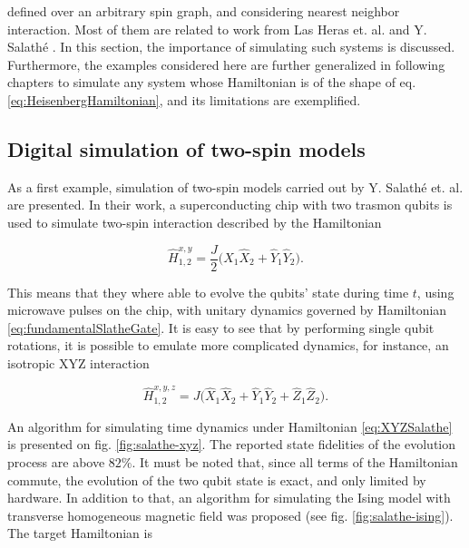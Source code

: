   \noindent defined over an arbitrary spin graph, and considering nearest neighbor interaction. Most of them are related to work from Las Heras et. al. \cite{HubbardSimul,HubbardSimulLasHeras} and Y. Salathé \cite{HeisenbergSimulLasHeras}. In this section, the importance of simulating such systems is discussed. Furthermore, the examples considered here are further generalized in following chapters to simulate any system whose Hamiltonian is of the shape of eq. \ref{eq:HeisenbergHamiltonian}, and its limitations are exemplified.

  \subsection{Digital simulation of two-spin models}
  \label{subsec:SalatheEtAl}

    As a first example, simulation of two-spin models carried out by Y. Salathé et. al. \cite{HeisenbergSimulLasHeras} are presented. In their work, a superconducting chip with two trasmon qubits is used to simulate two-spin interaction described by the Hamiltonian

    \begin{equation}
      \hat{H}_{1,2}^{x,y} = \frac{J}{2} \bigg( \hat{X}_1 \hat{X}_2 + \hat{Y}_1 \hat{Y}_2 \bigg).
      \label{eq:fundamentalSlatheGate}
    \end{equation}

    This means that they where able to evolve the qubits' state during time $t$, using microwave pulses on the chip, with unitary dynamics governed by Hamiltonian \ref{eq:fundamentalSlatheGate}. It is easy to see that by performing single qubit rotations, it is possible to emulate more complicated dynamics, for instance, an isotropic XYZ interaction

    \begin{equation}
      \hat{H}_{1,2}^{x,y,z} = J \bigg( \hat{X}_1 \hat{X}_2 + \hat{Y}_1 \hat{Y}_2 + \hat{Z}_1 \hat{Z}_2 \bigg).
      \label{eq:XYZSalathe}
    \end{equation}

    An algorithm for simulating time dynamics under Hamiltonian \ref{eq:XYZSalathe} is presented on fig. \ref{fig:salathe-xyz}. The reported state fidelities of the evolution process are above $82\%$. It must be noted that, since all terms of the Hamiltonian commute, the evolution of the two qubit state is exact, and only limited by hardware. In addition to that, an algorithm for simulating the Ising model with transverse homogeneous magnetic field was proposed (see fig. \ref{fig:salathe-ising}). The target Hamiltonian is
    
